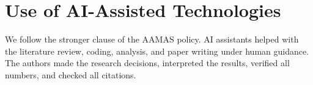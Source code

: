 \section*{Use of AI-Assisted Technologies}
We follow the stronger clause of the AAMAS policy. AI assistants helped with the literature review, coding, analysis, and paper writing under human guidance. The authors made the research decisions, interpreted the results, verified all numbers, and checked all citations.